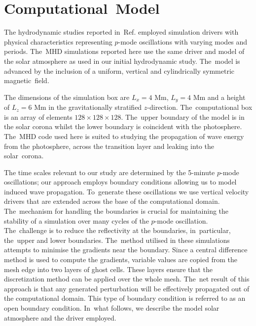 \documentclass[physics,article,accept,pdftex,moreauthors]{Definitions/mdpi}
\begin{document}
\section{Computational~Model}
\label{sec:compmod}
The hydrodynamic studies reported in~{Ref.} 
\cite{Griffiths2018b} employed simulation drivers with physical characteristics representing $p$-mode oscillations with varying modes and periods. The~MHD simulations reported here use the same driver and model of the solar atmosphere as used in our initial hydrodynamic study. The~model is  advanced by the inclusion of a uniform, vertical and cylindrically symmetric magnetic~field. 

 The dimensions of the simulation box are $L_{ x}= 4$ Mm,  $L_{y} =4$ Mm and a height of $L_{z} =6$ Mm in the gravitationally stratified $z$-direction. The~computational box is an array of elements 
 {$128 \times128 \times128 $.} %
The~upper boundary of the model is in the solar corona whilst the lower boundary is coincident with the photosphere. The~MHD code used here is suited to studying the propagation of wave energy from the photosphere, across the transition layer and leaking into the solar~corona. 
 
The time scales relevant to our study are determined by the 5-minute $p$-mode oscillations; our approach employs boundary conditions allowing us to model induced wave propagation. To~generate these oscillations we use vertical velocity drivers  that are extended across the base of the computational domain. The~mechanism for handling the boundaries is crucial for maintaining the stability of a simulation over many cycles of the 
 {$p$}-mode 
oscillation. The~challenge is to reduce the reflectivity at the boundaries, in~particular, the~upper and lower boundaries. The~method utilised in these simulations attempts to minimise the gradients near the boundary. Since a central difference method is used to compute the gradients, variable values are copied from the mesh edge into two layers of ghost cells. These layers ensure that the discretization method can be applied over the whole mesh. The~net result of this approach is that any generated perturbation will be effectively propagated out of the computational domain. This type of boundary condition is referred to as an open boundary condition. In~what follows, we describe the model solar atmosphere and the driver employed.
\end{document}
